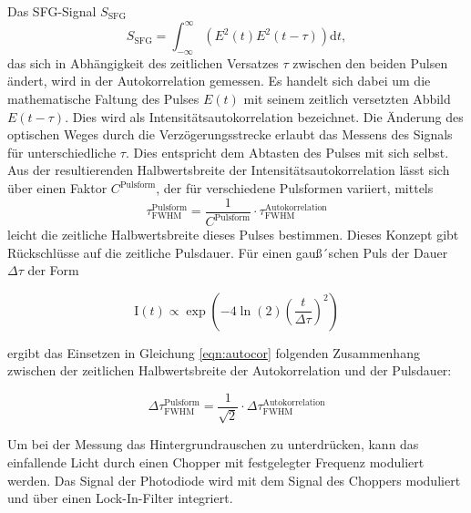         \FloatBarrier
        Das SFG-Signal $S_{\text{SFG}}$
        \begin{equation}
            S_{\text{SFG}} = \int_{-\infty}^{\infty} \left(E^2 (t)  E^2 (t-\tau)\right) \text{d}t ,
            \label{eqn:autocor}
        \end{equation}
        das sich in Abhängigkeit des zeitlichen Versatzes $\tau$ zwischen den beiden Pulsen ändert, wird in der Autokorrelation gemessen. Es handelt sich dabei um die mathematische Faltung des Pulses $E(t)$ 
        mit seinem zeitlich versetzten Abbild $E(t - \tau)$. Dies wird als Intensitätsautokorrelation bezeichnet. Die Änderung des optischen Weges durch die Verzögerungsstrecke erlaubt das Messens des Signals 
        für unterschiedliche $\tau$. Dies entspricht dem Abtasten des Pulses mit sich selbst. Aus der resultierenden Halbwertsbreite der Intensitätsautokorrelation lässt sich über einen Faktor 
        $C^{\text{Pulsform}}$, der für verschiedene Pulsformen variiert, mittels 
        \begin{equation*}
            \tau_{\text{FWHM}}^{\text{Pulsform}} = \frac{1}{C^{\text{Pulsform}}} \cdot \tau_{\text{FWHM}}^{\text{Autokorrelation}}
        \end{equation*}
        leicht die zeitliche Halbwertsbreite dieses Pulses bestimmen. Dieses Konzept gibt Rückschlüsse auf die zeitliche Pulsdauer. 
        Für einen gauß´schen Puls der Dauer $\Delta \tau$ der Form

        \begin{equation}
          \text{I}(t) \propto \exp\left(-4\ln(2)\left(\frac{t}{\Delta \tau}\right)^2\right)
        \end{equation}

        ergibt das Einsetzen in Gleichung \ref{eqn:autocor} folgenden Zusammenhang zwischen der zeitlichen Halbwertsbreite der Autokorrelation und der Pulsdauer:

        \begin{equation*}
          \Delta\tau_{\text{FWHM}}^{\text{Pulsform}} = \frac{1}{\sqrt{2}} \cdot \Delta\tau_{\text{FWHM}}^{\text{Autokorrelation}}
        \end{equation*}
        
        Um bei der Messung das Hintergrundrauschen zu unterdrücken, kann das 
        einfallende Licht durch einen Chopper mit festgelegter Frequenz moduliert werden. Das Signal der Photodiode wird mit dem Signal des Choppers moduliert und über einen Lock-In-Filter integriert.


